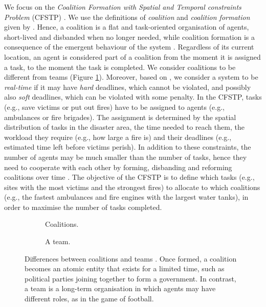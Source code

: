 We focus on the \emph{Coalition Formation with Spatial and Temporal constraints Problem}
(CFSTP) \cite{ramchurn2010cfstp}. We use the definitions of \emph{coalition} and
\emph{coalition formation} given by \cite{horling2005}. Hence, a coalition is a flat and
task-oriented organisation of agents, short-lived and disbanded when no longer needed,
while coalition formation is a consequence of the emergent behaviour of the system
\cite{mataric1993}.
Regardless of its current location, an agent is considered part of a coalition from the
moment it is assigned a task, to the moment the task is completed.
We consider coalitions to be different from teams (Figure \ref{fig:coalition-team}).
Moreover, based on \cite[Section $4.5$]{nunes2017taxonomy}, we consider a system to be
\emph{real-time} if it may have \emph{hard} deadlines, which cannot be violated, and
possibly also \emph{soft} deadlines, which can be violated with some penalty.
In the CFSTP, tasks (e.g., save victims or put out fires) have to be assigned to agents
(e.g., ambulances or fire brigades). The assignment is determined by the spatial
distribution of tasks in the disaster area, the time needed to reach them, the
workload they require (e.g., how large a fire is) and their deadlines (e.g., estimated
time left before victims perish). In addition to these constraints,
the number of agents may be much smaller than the number of tasks, hence they need to
cooperate with each other by forming, disbanding and reforming coalitions over time
\cite{shehory1998,epstein2011}.
The objective of the CFSTP is to define which tasks (e.g., sites with the most victims and
the strongest fires) to allocate to which coalitions (e.g., the fastest ambulances and
fire engines with the largest water tanks), in order to maximise the number of tasks
completed.
\begin{figure}[t]
    \centering
    \begin{subfigure}[b]{.49\textwidth}
        \centering
        
        \caption{Coalitions.}
    \end{subfigure}
    \hfill
    \begin{subfigure}[b]{.49\textwidth}
        \centering
        \caption{A team.}
    \end{subfigure}
    \caption[Differences between coalitions and teams]{%
        Differences between coalitions and teams \cite{horling2005}. Once formed, a
        coalition becomes an atomic entity that exists for a limited time, such
        as political parties joining together to form a government. In contrast, a team
        is a long-term organisation in which agents may have different roles, as in the
        game of football.}
    \label{fig:coalition-team}
\end{figure}

